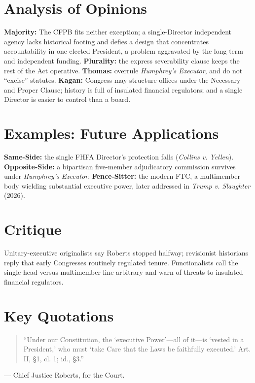 \documentclass[12pt]{article}
\begin{document}
\section{Analysis of Opinions}
\textbf{Majority:} The CFPB fits neither exception; a single-Director independent agency lacks historical footing and defies a design that concentrates accountability in one elected President, a problem aggravated by the long term and independent funding. \textbf{Plurality:} the express severability clause keeps the rest of the Act operative. \textbf{Thomas:} overrule \textit{Humphrey's Executor}, and do not ``excise'' statutes. \textbf{Kagan:} Congress may structure offices under the Necessary and Proper Clause; history is full of insulated financial regulators; and a single Director is easier to control than a board.

\section{Examples: Future Applications}
\textbf{Same-Side:} the single FHFA Director's protection falls (\textit{Collins v. Yellen}). \textbf{Opposite-Side:} a bipartisan five-member adjudicatory commission survives under \textit{Humphrey's Executor}. \textbf{Fence-Sitter:} the modern FTC, a multimember body wielding substantial executive power, later addressed in \textit{Trump v. Slaughter} (2026).

\section{Critique}
Unitary-executive originalists say Roberts stopped halfway; revisionist historians reply that early Congresses routinely regulated tenure. Functionalists call the single-head versus multimember line arbitrary and warn of threats to insulated financial regulators.

\section{Key Quotations}
\begin{quote}
``Under our Constitution, the `executive Power'---all of it---is `vested in a President,' who must `take Care that the Laws be faithfully executed.' Art. II, \S 1, cl. 1; id., \S 3.''
\end{quote}
\noindent --- Chief Justice Roberts, for the Court.
\end{document}
